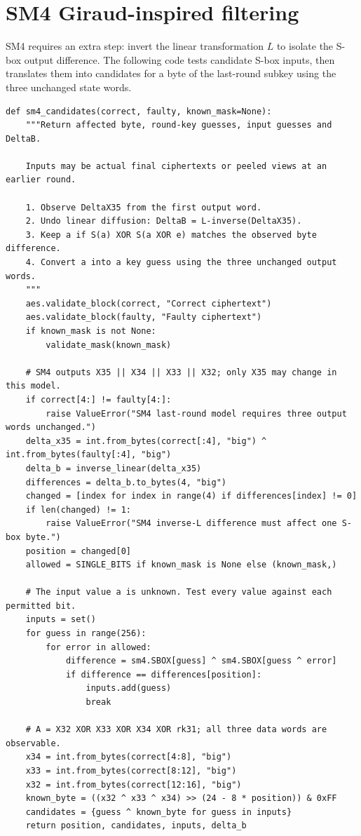 \documentclass[11pt,a4paper]{report}
\begin{document}
\section{SM4 Giraud-inspired filtering}
SM4 requires an extra step: invert the linear transformation $L$ to isolate the S-box output difference. The following code tests candidate S-box inputs, then translates them into candidates for a byte of the last-round subkey using the three unchanged state words.
\begin{lstlisting}[style=pycode,caption={SM4 S-box differential candidate filter, from giraud.py}]
def sm4_candidates(correct, faulty, known_mask=None):
    """Return affected byte, round-key guesses, input guesses and DeltaB.

    Inputs may be actual final ciphertexts or peeled views at an earlier round.

    1. Observe DeltaX35 from the first output word.
    2. Undo linear diffusion: DeltaB = L-inverse(DeltaX35).
    3. Keep a if S(a) XOR S(a XOR e) matches the observed byte difference.
    4. Convert a into a key guess using the three unchanged output words.
    """
    aes.validate_block(correct, "Correct ciphertext")
    aes.validate_block(faulty, "Faulty ciphertext")
    if known_mask is not None:
        validate_mask(known_mask)

    # SM4 outputs X35 || X34 || X33 || X32; only X35 may change in this model.
    if correct[4:] != faulty[4:]:
        raise ValueError("SM4 last-round model requires three output words unchanged.")
    delta_x35 = int.from_bytes(correct[:4], "big") ^ int.from_bytes(faulty[:4], "big")
    delta_b = inverse_linear(delta_x35)
    differences = delta_b.to_bytes(4, "big")
    changed = [index for index in range(4) if differences[index] != 0]
    if len(changed) != 1:
        raise ValueError("SM4 inverse-L difference must affect one S-box byte.")
    position = changed[0]
    allowed = SINGLE_BITS if known_mask is None else (known_mask,)

    # The input value a is unknown. Test every value against each permitted bit.
    inputs = set()
    for guess in range(256):
        for error in allowed:
            difference = sm4.SBOX[guess] ^ sm4.SBOX[guess ^ error]
            if difference == differences[position]:
                inputs.add(guess)
                break

    # A = X32 XOR X33 XOR X34 XOR rk31; all three data words are observable.
    x34 = int.from_bytes(correct[4:8], "big")
    x33 = int.from_bytes(correct[8:12], "big")
    x32 = int.from_bytes(correct[12:16], "big")
    known_byte = ((x32 ^ x33 ^ x34) >> (24 - 8 * position)) & 0xFF
    candidates = {guess ^ known_byte for guess in inputs}
    return position, candidates, inputs, delta_b
\end{lstlisting}
\end{document}
